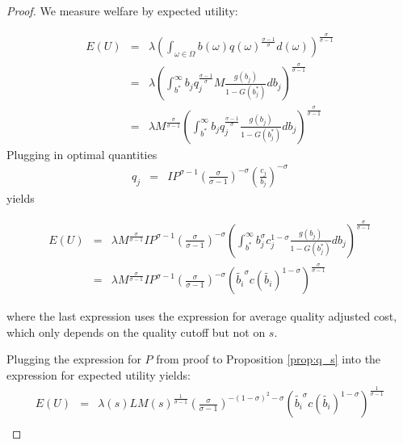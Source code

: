 \documentclass[12pt]{article}
\begin{document}
\begin{proof}

We measure welfare by expected utility:

\begin{eqnarray*}
    E(U) &= & \lambda  \left( \int_{\omega \in \Omega} b(\omega) q(\omega)^{\frac{\sigma - 1}{\sigma}} d(\omega) \right)^{\frac{\sigma}{\sigma - 1}} \\
 &= &   \lambda  \left( \int_{b^{\ast}}^{\infty} b_j q_j^{\frac{\sigma - 1}{\sigma}} M  \frac{g(b_j)}{1 - G(b_j^{\ast})}  d b_j  \right)^{\frac{\sigma}{\sigma - 1}} \\
  &= &   \lambda M^{\frac{\sigma}{\sigma - 1}} \left( \int_{b^{\ast}}^{\infty} b_j q_j^{\frac{\sigma - 1}{\sigma}}   \frac{g(b_j)}{1 - G(b_j^{\ast})}  d b_j  \right)^{\frac{\sigma}{\sigma - 1}}
\end{eqnarray*}
Plugging in optimal quantities
\begin{eqnarray*}
   q_j&=& I P^{\sigma-1} \left(\frac{\sigma}{\sigma - 1} \right)^{-\sigma} \left( \frac{c_j}{b_j} \right)^{-\sigma}
\end{eqnarray*}
yields

\begin{eqnarray*}
 E(U)  &=&  \lambda  M^{\frac{\sigma}{\sigma - 1}} I P^{\sigma-1} \left(\frac{\sigma}{\sigma - 1} \right)^{-\sigma}   \left(  \int_{b^{\ast}}^{\infty} b_j^{\sigma} c_j^{1-\sigma}  \frac{g(b_j)}{1 - G(b_j^{\ast})}  d b_j \right)^{\frac{\sigma}{\sigma - 1}} \\
 &=&  \lambda  M^{\frac{\sigma}{\sigma - 1}} I P^{\sigma-1} \left(\frac{\sigma}{\sigma - 1} \right)^{-\sigma}   \left( \tilde{b_i}^{\sigma}c(\tilde{b_i})^{1-\sigma} \right)^{\frac{\sigma}{\sigma - 1}} 
\end{eqnarray*}

\noindent where the last expression uses the expression for average quality adjusted cost, which only depends on the quality cutoff but not on $s$.



Plugging the expression for $P$ from proof to Proposition \ref{prop:q_s}  into the expression for expected utility yields:
\begin{eqnarray*}
 E(U)      &=&  \lambda(s) L M(s)^{\frac{1}{\sigma-1}} \left(\frac{\sigma}{\sigma - 1}  \right)^{-(1-\sigma)^2-\sigma}        \left( \tilde{b_i}^{\sigma}c(\tilde{b_i})^{1-\sigma} \right)^{\frac{1}{\sigma - 1}} \\
\end{eqnarray*}



\end{proof}
\end{document}
